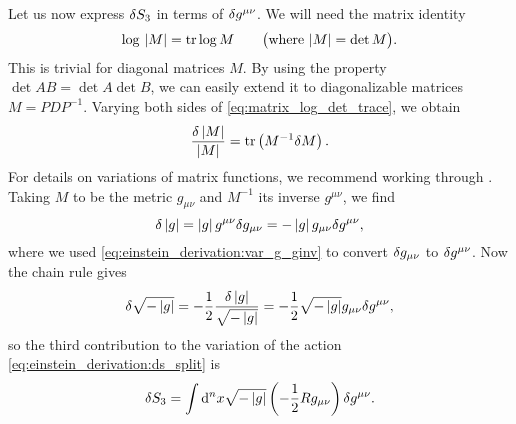 Let us now express $\delta S_3$ in terms of $\delta g^{\mu \nu}$.
We will need the matrix identity
\begin{equation}
	\log \, \left\lvert M \right\rvert = \text{tr} \log M
	\qquad \big( \text{where $\left\lvert M \right\rvert = \operatorname{det}{M}$} \big) .
	\label{eq:matrix_log_det_trace}
\end{equation}
This is trivial for diagonal matrices $M$.
By using the property $\det{AB} = \det{A} \det{B}$, we can easily extend it to diagonalizable matrices $M = P D P^{-1}$.
Varying both sides of \cref{eq:matrix_log_det_trace}, we obtain
\begin{equation}
	\frac{\delta \left\lvert M \right\rvert}{\left\lvert M \right\rvert} = \text{tr} \left( M^{-1} \delta M \right) .
\end{equation}
For details on variations of matrix functions, we recommend working through \cite{ref:matrix_ln_det_tr_exercise}.
Taking $M$ to be the metric $g_{\mu \nu}$ and $M^{-1}$ its inverse $g^{\mu \nu}$, we find
\begin{equation}
	\delta \left\lvert g \right\rvert = \left\lvert g \right\rvert g^{\mu \nu} \delta g_{\mu \nu} = -\left\lvert g \right\rvert g_{\mu \nu} \delta g^{\mu \nu} ,
\end{equation}
where we used \cref{eq:einstein_derivation:var_g_ginv} to convert $\delta g_{\mu \nu}$ to $\delta g^{\mu \nu}$.
Now the chain rule gives
\begin{equation}
	\delta \sqrt{-\left\lvert g \right\rvert} = -\frac{1}{2} \frac{\delta \left\lvert g \right\rvert}{\sqrt{-\left\lvert g \right\rvert}} = -\frac{1}{2} \sqrt{-\left\lvert g \right\rvert} g_{\mu \nu} \delta g^{\mu \nu},
\end{equation}
so the third contribution to the variation of the action \eqref{eq:einstein_derivation:ds_split} is
\begin{equation}
	\delta S_3 = \int \mathop{}\!\mathrm{d}^n x \sqrt{-\left\lvert g \right\rvert} \left( -\frac{1}{2} R g_{\mu \nu} \right) \delta g^{\mu \nu} .
\end{equation}

